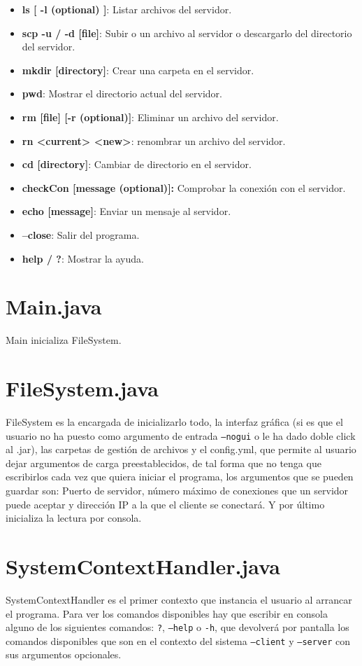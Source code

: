 \documentclass[a4paper, 12pt]{report}
\begin{document}
\begin{itemize}
	\item \textbf{ls [ -l (optional) ]}: Listar archivos del servidor.
	\item \textbf{scp -u / -d [file]}: Subir o un archivo al servidor o descargarlo del directorio del servidor.
	\item \textbf{mkdir [directory]}: Crear una carpeta en el servidor.
	\item \textbf{pwd}: Mostrar el directorio actual del servidor.
	\item \textbf{rm [file] [-r (optional)]}: Eliminar un archivo del servidor.
	\item \textbf{rn <current> <new>}: renombrar un archivo del servidor.
	\item \textbf{cd [directory]}: Cambiar de directorio en el servidor.
	\item \textbf{checkCon [message (optional)]:} Comprobar la conexión con el servidor.
	\item \textbf{echo [message]}: Enviar un mensaje al servidor.
	\item \textbf{--close}: Salir del programa.
	\item \textbf{help / ?}: Mostrar la ayuda.
\end{itemize}

\section{Main.java}
Main inicializa FileSystem.
\section{FileSystem.java}
FileSystem es la encargada de inicializarlo todo, la interfaz gráfica (si es que el usuario no ha puesto como argumento de entrada \texttt{--nogui} o le ha dado doble click al .jar), las carpetas de gestión de archivos y el config.yml, que permite al usuario dejar argumentos de carga preestablecidos, de tal forma que no tenga que escribirlos cada vez que quiera iniciar el programa, los argumentos que se pueden guardar son:
Puerto de servidor, número máximo de conexiones que un servidor puede aceptar y dirección IP a la que el cliente se conectará.
Y por último inicializa la lectura por consola.
\section{SystemContextHandler.java}
SystemContextHandler es el primer contexto que instancia el usuario al arrancar el programa. 
Para ver los comandos disponibles hay que escribir en consola alguno de los siguientes comandos: 
\texttt{?}, \texttt{--help} o \texttt{-h}, que devolverá por pantalla los comandos disponibles que son 
en el contexto del sistema \texttt{--client} y \texttt{--server} con sus argumentos opcionales.
\end{document}
